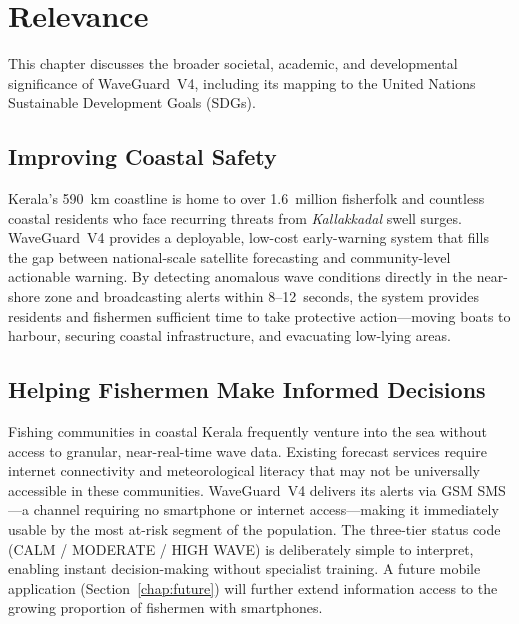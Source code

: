 \chapter{Relevance}
\label{chap:relevance}

This chapter discusses the broader societal, academic, and developmental significance
of WaveGuard~V4, including its mapping to the United Nations Sustainable Development
Goals (SDGs).

\section{Improving Coastal Safety}

Kerala's 590~km coastline is home to over 1.6~million fisherfolk and countless coastal
residents who face recurring threats from \textit{Kallakkadal} swell surges.
WaveGuard~V4 provides a deployable, low-cost early-warning system that fills the gap
between national-scale satellite forecasting and community-level actionable warning.
By detecting anomalous wave conditions directly in the near-shore zone and
broadcasting alerts within 8--12~seconds, the system provides residents and fishermen
sufficient time to take protective action---moving boats to harbour, securing coastal
infrastructure, and evacuating low-lying areas.

\section{Helping Fishermen Make Informed Decisions}

Fishing communities in coastal Kerala frequently venture into the sea without access
to granular, near-real-time wave data.
Existing forecast services require internet connectivity and meteorological literacy
that may not be universally accessible in these communities.
WaveGuard~V4 delivers its alerts via GSM SMS---a channel requiring no smartphone or
internet access---making it immediately usable by the most at-risk segment of the
population.
The three-tier status code (CALM / MODERATE / HIGH WAVE) is deliberately simple to
interpret, enabling instant decision-making without specialist training.
A future mobile application (Section~\ref{chap:future}) will further extend
information access to the growing proportion of fishermen with smartphones.

